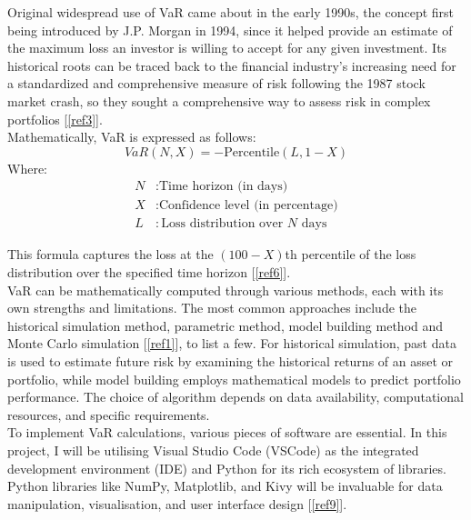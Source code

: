 \documentclass{article}
\begin{document}
Original widespread use of VaR came about in the early 1990s, the concept first being introduced by J.P. Morgan in 1994, since it helped provide an estimate of the maximum loss an investor is willing to accept for any given investment. Its historical roots can be traced back to the financial industry's increasing need for a standardized and comprehensive measure of risk following the 1987 stock market crash, so they sought a comprehensive way to assess risk in complex portfolios [\ref{ref3}]. \\

Mathematically, VaR is expressed as follows:
\begin{equation}
VaR(N, X) = -\text{Percentile}(L, 1 - X)
\end{equation}
Where:
\begin{align*}
N & : \text{Time horizon (in days)} \\
X & : \text{Confidence level (in percentage)} \\
L & : \text{Loss distribution over } N \text{ days}
\end{align*}

This formula captures the loss at the \((100-X)\)th percentile of the loss distribution over the specified time horizon [\ref{ref6}]. \\

VaR can be mathematically computed through various methods, each with its own strengths and limitations. The most common approaches include the historical simulation method, parametric method, model building method and Monte Carlo simulation [\ref{ref1}], to list a few. For historical simulation, past data is used to estimate future risk by examining the historical returns of an asset or portfolio, while model building employs mathematical models to predict portfolio performance. The choice of algorithm depends on data availability, computational resources, and specific requirements. \\

To implement VaR calculations, various pieces of software are essential. In this project, I will be utilising Visual Studio Code (VSCode) as the integrated development environment (IDE) and Python for its rich ecosystem of libraries. Python libraries like NumPy, Matplotlib, and Kivy will be invaluable for data manipulation, visualisation, and user interface design [\ref{ref9}]. \\
\end{document}
